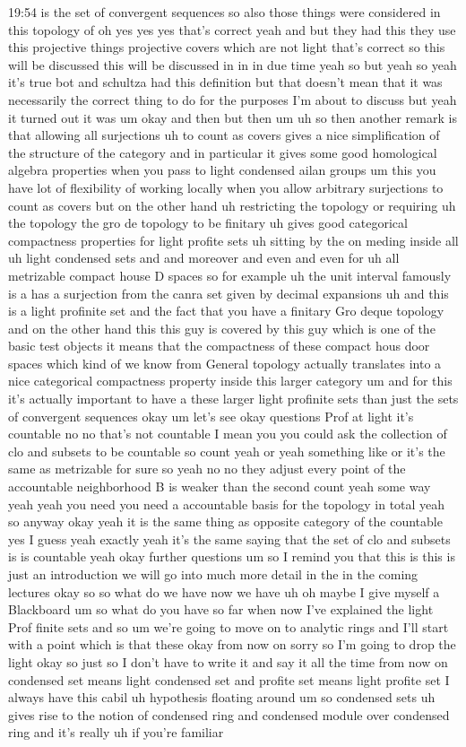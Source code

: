 \begin{unfinished}{19:54}
is the set of convergent sequences so also those things were considered in this topology of oh yes yes yes that's correct yeah and but they had this they use this projective things projective covers which are not light that's correct so this will be discussed this will be discussed in in in due time yeah so but yeah so yeah it's true bot and schultza had this definition but that doesn't mean that it was necessarily the correct thing to do for the purposes I'm about to discuss but yeah it turned out it was um okay and then but then um uh so then another remark is that allowing all surjections uh to count as covers gives a nice simplification of the structure of the category and in particular it gives some good homological algebra properties when you pass to light condensed ailan groups um this you have lot of flexibility of working locally when you allow arbitrary surjections to count as covers but on the other hand uh restricting the topology or requiring uh the topology the gro de topology to be finitary uh gives good categorical compactness properties for light profite sets uh sitting by the on meding inside all uh light condensed sets and and moreover and even and even for uh all metrizable compact house D spaces so for example uh the unit interval famously is a has a surjection from the canra set given by decimal expansions uh and this is a light profinite set and the fact that you have a finitary Gro deque topology and on the other hand this this guy is covered by this guy which is one of the basic test objects it means that the compactness of these compact hous door spaces which kind of we know from General topology actually translates into a nice categorical compactness property inside this larger category um and for this it's actually important to have a these larger light profinite sets than just the sets of convergent sequences okay um let's see okay questions Prof at light it's countable no no that's not countable I mean you you could ask the collection of clo and subsets to be countable so count yeah or yeah something like or it's the same as metrizable for sure so yeah no no they adjust every point of the accountable neighborhood B is weaker than the second count yeah some way yeah yeah you need you need a accountable basis for the topology in total yeah so anyway okay yeah it is the same thing as opposite category of the countable yes I guess yeah exactly yeah it's the same saying that the set of clo and subsets is is countable yeah okay further questions um so I remind you that this is this is just an introduction we will go into much more detail in the in the coming lectures okay so so what do we have now we have uh oh maybe I give myself a Blackboard um so what do you have so far when now I've explained the light Prof finite sets and so um we're going to move on to analytic rings and I'll start with a point which is that these okay from now on sorry so I'm going to drop the light okay so just so I don't have to write it and say it all the time from now on condensed set means light condensed set and profite set means light profite set I always have this cabil uh hypothesis floating around um so condensed sets uh gives rise to the notion of condensed ring and condensed module over condensed ring and it's really uh if you're familiar 
\end{unfinished}
